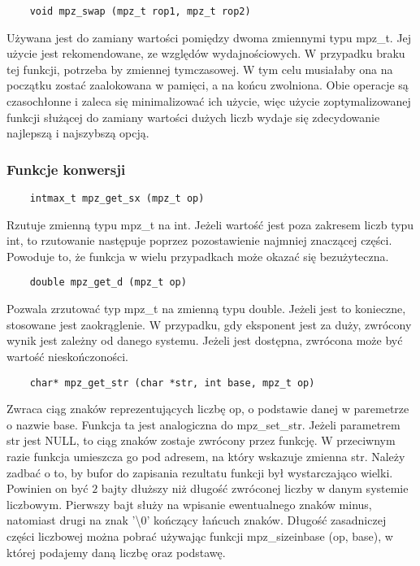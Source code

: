 \documentclass[oneside,a4paper]{book}
\begin{document}
	\begin{lstlisting}
	void mpz_swap (mpz_t rop1, mpz_t rop2)
	\end{lstlisting}
	
	Używana jest do zamiany wartości pomiędzy dwoma zmiennymi typu mpz\_t. Jej użycie jest rekomendowane, ze względów wydajnościowych. W przypadku braku tej funkcji, potrzeba by zmiennej tymczasowej. W tym celu musiałaby ona na początku zostać zaalokowana w pamięci, a na końcu zwolniona. Obie operacje są czasochłonne i zaleca się minimalizować ich użycie, więc użycie zoptymalizowanej funkcji służącej do zamiany wartości dużych liczb wydaje się zdecydowanie najlepszą i najszybszą opcją.
	
	\subsubsection{Funkcje konwersji}
	
	\begin{lstlisting}
	intmax_t mpz_get_sx (mpz_t op)
	\end{lstlisting}
	
	Rzutuje zmienną typu mpz\_t na int. Jeżeli wartość jest poza zakresem liczb typu int, to rzutowanie następuje poprzez pozostawienie najmniej znaczącej części. Powoduje to, że funkcja w wielu przypadkach może okazać się bezużyteczna.
	
	\begin{lstlisting}
	double mpz_get_d (mpz_t op)
	\end{lstlisting}
	
	Pozwala zrzutować typ mpz\_t na zmienną typu double. Jeżeli jest to konieczne, stosowane jest zaokrąglenie. W przypadku, gdy eksponent jest za duży, zwrócony wynik jest zależny od danego systemu. Jeżeli jest dostępna, zwrócona może być wartość nieskończoności.
	
	\begin{lstlisting}
	char* mpz_get_str (char *str, int base, mpz_t op)
	\end{lstlisting}
	
	Zwraca ciąg znaków reprezentujących liczbę op, o podstawie danej w paremetrze o nazwie base. Funkcja ta jest analogiczna do mpz\_set\_str. Jeżeli parametrem str jest NULL, to ciąg znaków zostaje zwrócony przez funkcję. W przeciwnym razie funkcja umieszcza go pod adresem, na który wskazuje zmienna str. Należy zadbać o to, by bufor do zapisania rezultatu funkcji był wystarczająco wielki. Powinien on być $2$ bajty dłuższy niż długość zwróconej liczby w danym systemie liczbowym. Pierwszy bajt służy na wpisanie ewentualnego znaków minus, natomiast drugi na znak '\textbackslash$0$' kończący łańcuch znaków. Długość zasadniczej części liczbowej można pobrać używając funkcji mpz\_sizeinbase (op, base), w której podajemy daną liczbę oraz podstawę.
	
\end{document}
